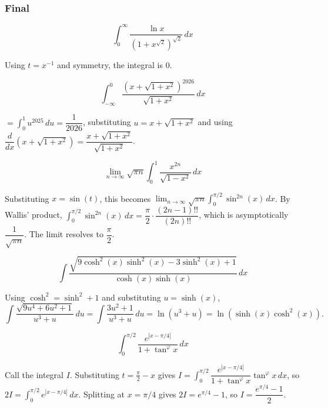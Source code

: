 \subsubsection*{Final}
\begin{questions}

\question \[ \int_0^\infty \frac{\ln x}{\left(1+x^{\sqrt2}\right)^{\sqrt2}}\, dx \]
\begin{solution}
Using $t=x^{-1}$ and symmetry, the integral is $0$.
\end{solution}

\question \[ \int_{-\infty}^0 \frac{\left(x+\sqrt{1+x^2}\right)^{2026}}{\sqrt{1+x^2}}\, dx \]
\begin{solution}
$= \displaystyle\int_0^1 u^{2025}\, du = \dfrac{1}{2026}$, substituting $u=x+\sqrt{1+x^2}$ and using $\dfrac{d}{dx}\left(x+\sqrt{1+x^2}\right) = \dfrac{x+\sqrt{1+x^2}}{\sqrt{1+x^2}}$.
\end{solution}

\question \[ \lim_{n\to\infty} \sqrt{\pi n}\int_0^1 \frac{x^{2n}}{\sqrt{1-x^2}}\, dx \]
\begin{solution}
Substituting $x=\sin(t)$, this becomes $\lim_{n\to\infty} \sqrt{\pi n}\int_0^{\pi/2} \sin^{2n}(x)\, dx$. By Wallis' product, $\int_0^{\pi/2}\sin^{2n}(x)\,dx = \dfrac{\pi}{2}\cdot\dfrac{(2n-1)!!}{(2n)!!}$, which is asymptotically $\dfrac{1}{\sqrt{\pi n}}$. The limit resolves to $\dfrac{\pi}{2}$.
\end{solution}

\question \[ \int \frac{\sqrt{9\cosh^2(x)\sinh^2(x) - 3\sinh^2(x) + 1}}{\cosh(x)\sinh(x)}\, dx \]
\begin{solution}
Using $\cosh^2=\sinh^2+1$ and substituting $u=\sinh(x)$,
\[ \int \frac{\sqrt{9u^4+6u^2+1}}{u^3+u}\, du = \int \frac{3u^2+1}{u^3+u}\, du = \ln(u^3+u) = \ln\left(\sinh(x)\cosh^2(x)\right). \]
\end{solution}

\question \[ \int_0^{\pi/2} \frac{e^{\left|x-\pi/4\right|}}{1+\tan^{\varphi}x}\, dx \]
\begin{solution}
Call the integral $I$. Substituting $t=\tfrac{\pi}{2}-x$ gives $I = \int_0^{\pi/2} \dfrac{e^{|x-\pi/4|}}{1+\tan^\varphi x}\tan^\varphi x\, dx$, so $2I = \int_0^{\pi/2} e^{|x-\pi/4|}\, dx$. Splitting at $x=\pi/4$ gives $2I = e^{\pi/4}-1$, so $I = \dfrac{e^{\pi/4}-1}{2}$.
\end{solution}

\end{questions}

